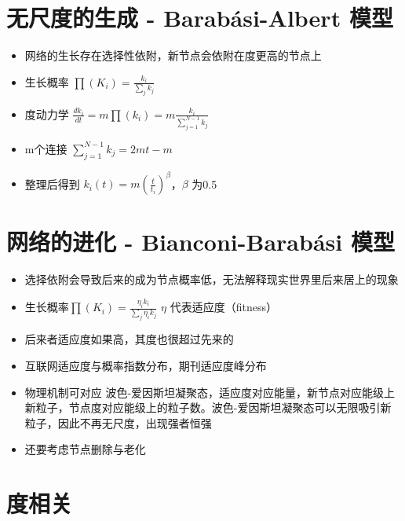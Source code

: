 \documentclass[]{book}
\providecommand{\tightlist}{%
  \setlength{\itemsep}{0pt}\setlength{\parskip}{0pt}}
\begin{document}
\hypertarget{ux65e0ux5c3aux5ea6ux7684ux751fux6210---barabuxe1si-albert-ux6a21ux578b}{%
\section{无尺度的生成 - Barabási-Albert 模型}\label{ux65e0ux5c3aux5ea6ux7684ux751fux6210---barabuxe1si-albert-ux6a21ux578b}}

\begin{itemize}
\tightlist
\item
  网络的生长存在选择性依附，新节点会依附在度更高的节点上
\item
  生长概率 \(\prod (K_i) = \frac{k_i}{\sum_jk_j}\)
\item
  度动力学 \(\frac{dk_i}{dt} = m\prod(k_i) = m\frac{k_i}{\sum_{j=1}^{N-1}k_j}\)
\item
  m个连接 \(\sum_{j=1}^{N-1}k_j = 2mt-m\)
\item
  整理后得到 \(k_i(t) = m(\frac{t}{t_i})^{\beta}\)，\(\beta\) 为0.5
\end{itemize}

\hypertarget{ux7f51ux7edcux7684ux8fdbux5316---bianconi-barabuxe1si-ux6a21ux578b}{%
\section{网络的进化 - Bianconi-Barabási 模型}\label{ux7f51ux7edcux7684ux8fdbux5316---bianconi-barabuxe1si-ux6a21ux578b}}

\begin{itemize}
\tightlist
\item
  选择依附会导致后来的成为节点概率低，无法解释现实世界里后来居上的现象
\item
  生长概率\(\prod (K_i) = \frac{\eta_ik_i}{\sum_j\eta_i k_j}\) \(\eta\) 代表适应度（fitness）
\item
  后来者适应度如果高，其度也很超过先来的
\item
  互联网适应度与概率指数分布，期刊适应度峰分布
\item
  物理机制可对应 波色-爱因斯坦凝聚态，适应度对应能量，新节点对应能级上新粒子，节点度对应能级上的粒子数。波色-爱因斯坦凝聚态可以无限吸引新粒子，因此不再无尺度，出现强者恒强
\item
  还要考虑节点删除与老化
\end{itemize}

\hypertarget{ux5ea6ux76f8ux5173}{%
\section{度相关}\label{ux5ea6ux76f8ux5173}}
\end{document}
